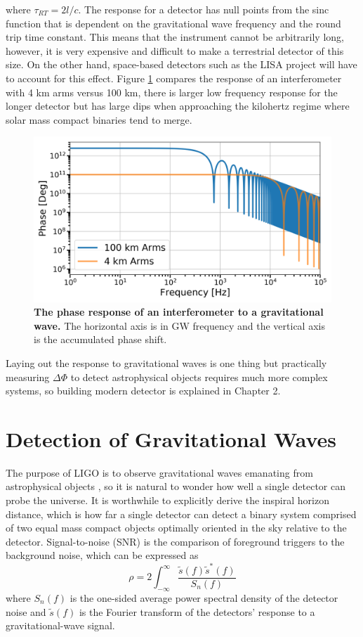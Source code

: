 	where $\tau_{RT} = 2l/c$.  The response for a detector has null points from the sinc function that is dependent on the gravitational wave frequency and the round trip time constant.  This means that the instrument cannot be arbitrarily long, however, it is very expensive and difficult to make a terrestrial detector of this size.  On the other hand, space-based detectors such as the LISA project will have to account for this effect.  Figure \ref{fig:sincgw} compares the response of an interferometer with 4 km arms versus 100 km, there is larger low frequency response for the longer detector but has large dips when approaching the kilohertz regime where solar mass compact binaries tend to merge.
	\begin{figure}[ht]
		\centering
		\includegraphics[width=.7 \textwidth]{../Figures/SincGW.png}
		\caption[The phase response of an interferometer to a gravitational wave.]  
		{\textbf{The phase response of an interferometer to a gravitational wave.} The horizontal axis is in GW frequency and the vertical axis is the accumulated phase shift.}
		\label{fig:sincgw}
	\end{figure}
	Laying out the response to gravitational waves is one thing but practically measuring $\Delta \Phi$ to detect astrophysical objects requires much more complex systems, so building modern detector is explained in Chapter 2.

	\section{Detection of Gravitational Waves}\label{detectgw}
	The purpose of LIGO is to observe gravitational waves emanating from astrophysical objects \cite{NSFproposal}, so it is natural to wonder how well a single detector can probe the universe.  It is worthwhile to explicitly derive the inspiral horizon distance, which is how far a single detector can detect a binary system comprised of two equal mass compact objects optimally oriented in the sky relative to the detector.  Signal-to-noise (SNR) is the comparison of foreground triggers to the background noise, which can be expressed as
	\begin{equation}\label{SNR}
	\rho = 2 \int_{-\infty}^{\infty} \frac{ \tilde{s}(f) \tilde{s}^*(f) }{S_n(f)}
	\end{equation}
	where ${S_n(f)}$ is the one-sided average power spectral density of the detector noise and $\tilde{s}(f)$ is the Fourier transform of the detectors' response to a gravitational-wave signal.
	
